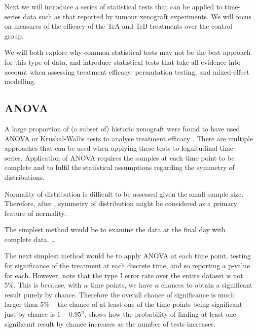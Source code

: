 Next we will introduce a series of statistical tests that can be applied to time-series data such as that reported by tumour xenograft experiments.
We will focus on measures of the efficacy of the TrA and TrB treatments over the control group.

We will both explore why common statistical tests may not be the best approach for this type of data, and introduce statistical tests that take all evidence into account when assessing treatment efficacy: permutation testing, and mixed-effect modelling.

\subsection{ANOVA}

A large proportion of (a subset of) historic xenograft were found to have used ANOVA or Kruskal-Wallis tests to analyse treatment efficacy \autocite{Heitjan:1993uw}.
There are multiple approaches that can be used when applying these tests to lognitudinal time-series.
Application of ANOVA requires the samples at each time point to be complete and to fulfil the statistical assumptions regarding the symmetry of distributions.
\begin{marginnoteblock}
	Normality of distribution is difficult to be assessed given the small sample size.
	Therefore, after \autocite{Heitjan:1993uw}, symmetry of distribution might be considered as a primary feature of normality.
\end{marginnoteblock}

The simplest method would be to examine the data at the final day with complete data.
\ldots

The next simplest method would be to apply ANOVA at each time point, testing for significance of the treatment at each discrete time, and so reporting a p-value for each.
However, note that the type I error rate over the entire dataset is not 5\%.
This is because, with $n$ time points, we have $n$ chances to obtain a significant result purely by chance.
Therefore the overall chance of significance is much larger than 5\% -- the chance of at least one of the time points being significant just by chance is $1 - 0.95^n$.
 shows how the probability of finding at least one significant result by chance increases as the number of tests increases.

